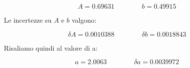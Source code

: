 \begin{equation}
    A = 0.69631 \qquad \qquad b = 0.49915
\end{equation}

Le incertezze su $A$ e $b$ valgono:

\begin{equation}
    \delta A = 0.0010388 \qquad \qquad \delta b = 0.0018843
\end{equation}

Risaliamo quindi al valore di a:

\begin{equation}
    a = 2.0063 \qquad \qquad \delta a = 0.0039972
\end{equation}
